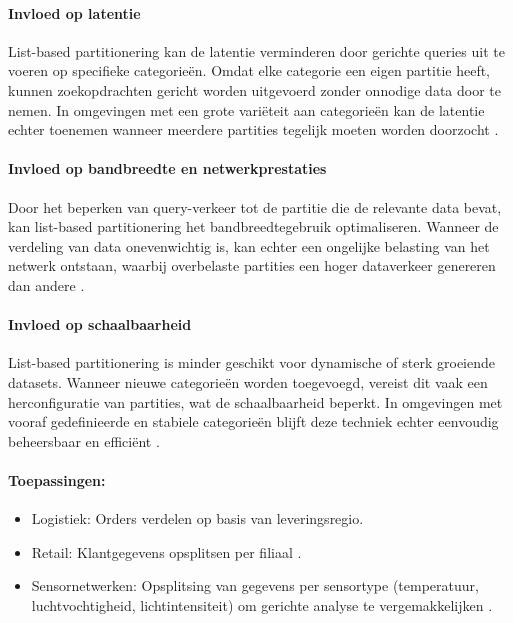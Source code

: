 \paragraph{Invloed op latentie} 
List-based partitionering kan de latentie verminderen door gerichte queries uit te voeren op specifieke categorieën. Omdat elke categorie een eigen partitie heeft, kunnen zoekopdrachten gericht worden uitgevoerd zonder onnodige data door te nemen. In omgevingen met een grote variëteit aan categorieën kan de latentie echter toenemen wanneer meerdere partities tegelijk moeten worden doorzocht \autocite{Ponnusamy2024, Mahmud2020}.
 
\paragraph{Invloed op bandbreedte en netwerkprestaties} 
Door het beperken van query-verkeer tot de partitie die de relevante data bevat, kan list-based partitionering het bandbreedtegebruik optimaliseren. Wanneer de verdeling van data onevenwichtig is, kan echter een ongelijke belasting van het netwerk ontstaan, waarbij overbelaste partities een hoger dataverkeer genereren dan andere \autocite{Ponnusamy2024}.
 
\paragraph{Invloed op schaalbaarheid} 
List-based partitionering is minder geschikt voor dynamische of sterk groeiende datasets. Wanneer nieuwe categorieën worden toegevoegd, vereist dit vaak een herconfiguratie van partities, wat de schaalbaarheid beperkt. In omgevingen met vooraf gedefinieerde en stabiele categorieën blijft deze techniek echter eenvoudig beheersbaar en efficiënt \autocite{Mahmud2020}.
 
\paragraph{Toepassingen:}
\begin{itemize}
    \item Logistiek: Orders verdelen op basis van leveringsregio.
    \item Retail: Klantgegevens opsplitsen per filiaal \autocite{Ponnusamy2024}.
    \item Sensornetwerken: Opsplitsing van gegevens per sensortype (temperatuur, luchtvochtigheid, lichtintensiteit) om gerichte analyse te vergemakkelijken \autocite{Mahmud2020}.
\end{itemize}

